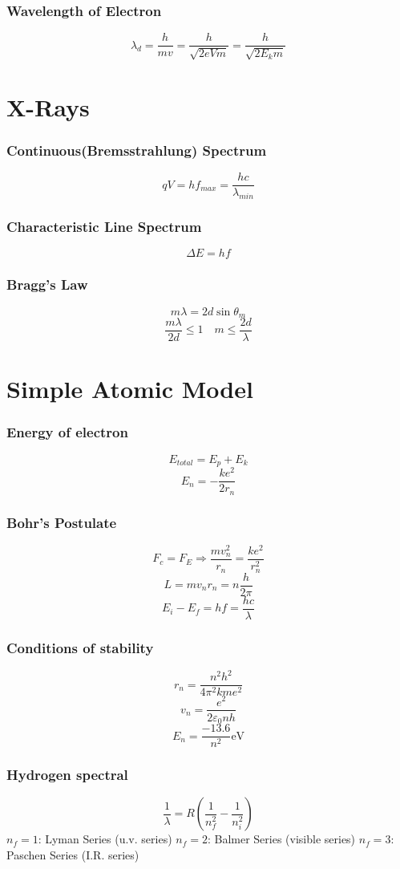 \documentclass{article}
\begin{document}
\subsubsection*{Wavelength of Electron}
\[\lambda_d=\frac{h}{mv}=\frac{h}{\sqrt{2eVm}}=\frac{h}{\sqrt{2E_km}}\]

\section{X-Rays}
\subsubsection*{Continuous(Bremsstrahlung) Spectrum}
\[qV=hf_{max}=\frac{hc}{\lambda_{min}}\]

\subsubsection*{Characteristic Line Spectrum}
\[\Delta E=hf\]

\subsubsection*{Bragg's Law}
\[m\lambda=2d\sin\theta_m\]
\[\frac{m\lambda}{2d}\leq 1\quad m\leq\frac{2d}{\lambda}\]

\section{Simple Atomic Model}
\subsubsection*{Energy of electron}
\[E_{total}=E_p+E_k\]
\[E_n=-\frac{ke^2}{2r_n}\]

\subsubsection{Bohr's Postulate}
\[F_c=F_E \Rightarrow \frac{mv_n^2}{r_n}=\frac{ke^2}{r_n^2}\]
\[L=mv_nr_n=n\frac{h}{2\pi}\]
\[E_i-E_f=hf=\frac{hc}{\lambda}\]

\subsubsection*{Conditions of stability}
\[r_n=\frac{n^2h^2}{4\pi^2kme^2}\]
\[v_n=\frac{e^2}{2 \varepsilon_0 nh}\]
\[E_n=\frac{-13.6}{n^2}\mathrm{eV}\]

\subsubsection*{Hydrogen spectral}
\[\frac{1}{\lambda}=R(\frac{1}{n^2_f}-\frac{1}{n^2_i})\]
\(n_f=1\): Lyman Series (u.v. series)
\(n_f=2\): Balmer Series (visible series)
\(n_f=3\): Paschen Series (I.R. series)
\end{document}
